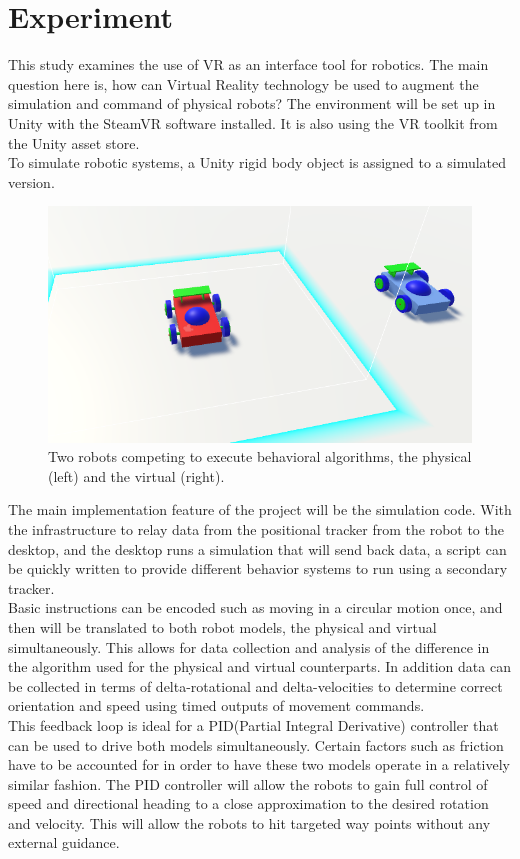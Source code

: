 \documentclass[10pt,a4paper]{article}
\begin{document}
	\section*{Experiment}
	This study examines the use of VR as an interface tool for robotics. The main question here is, how can Virtual Reality technology be used to augment the simulation and command of physical robots? The environment will be set up in Unity with the SteamVR software installed. It is also using the VR toolkit from the Unity asset store.
	\\ 
	To simulate robotic systems, a Unity rigid body object is assigned to a simulated version. 		\begin{figure}[h]
		\centering
		\includegraphics[width=.4\textwidth]{robot-rivalry.png}
		\caption{Two robots competing to execute behavioral algorithms, the physical (left) and the virtual (right).}
		\label{fig:robot-rivalry}
	\end{figure}
	The main implementation feature of the project will be the simulation code. With the infrastructure to relay data from the positional tracker from the robot to the desktop, and the desktop runs a simulation that will send back data, a script can be quickly written to provide different behavior systems to run using a secondary tracker.
	\\ 
	Basic instructions can be encoded such as moving in a circular motion once, and then will be translated to both robot models, the physical and virtual simultaneously. This allows for data collection and analysis of the difference in the algorithm used for the physical and virtual counterparts. In addition data can be collected in terms of delta-rotational and delta-velocities to determine correct orientation and speed using timed outputs of movement commands.
	\\ 
	This feedback loop is ideal for a PID(Partial Integral Derivative) controller that can be used to drive both models simultaneously. Certain factors such as friction have to be accounted for in order to have these two models operate in a relatively similar fashion. The PID controller will allow the robots to gain full control of speed and directional heading to a close approximation to the desired rotation and velocity. This will allow the robots to hit targeted way points without any external guidance.
\end{document}
